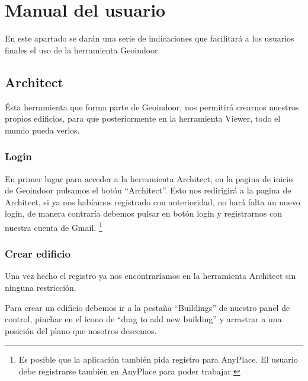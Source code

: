 

\section{Manual del usuario}

En este apartado se darán una serie de indicaciones que facilitará a los usuarios finales el uso de la herramienta Geoindoor.


\subsection{Architect}

Ésta herramienta que forma parte de Geoindoor, nos permitirá crearnos nuestros propios edificios, para que posteriormente en la herramienta Viewer, todo el mundo pueda verlos.


\subsubsection{Login}

En primer lugar para acceder a la herramienta Architect, en la pagina de inicio de Geoindoor pulsamos el botón ``Architect''. Esto nos redirigirá a la pagina de Architect, si ya nos habíamos registrado con anterioridad, no hará falta un nuevo login, de manera contraría debemos pulsar en botón login y registrarnos con nuestra cuenta de Gmail. \footnote{Es posible que la aplicación también pida registro para AnyPlace. El usuario debe registrarse también en AnyPlace para poder trabajar.}



\subsubsection{Crear edificio}

Una vez hecho el registro ya nos encontraríamos en la herramienta Architect sin ninguna restricción.

Para crear un edificio debemos ir a la pestaña ``Buildings'' de nuestro panel de control, pinchar en el icono de ``drag to add new building'' y arrastrar a una posición del plano que nosotros deseemos.

